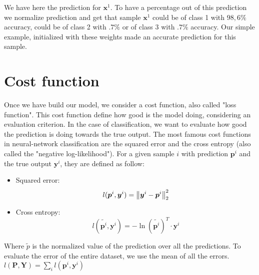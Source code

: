 		We have here the prediction for $\boldsymbol{x}^1$. To have a percentage out of this prediction we normalize prediction and get that sample $\boldsymbol{x}^1$ could be of class 1 with $98,6\%$ accuracy, could be of class 2 with $.7\%$ or of class 3 with $.7\%$ accuracy. Our simple example, initialized with these weights made an accurate prediction for this sample.
	

	\section{Cost function}
	\label{sec:cost_function}
		Once we have build our model, we consider a cost function, also called "loss function". This cost function define how good is the model doing, considering an evaluation criterion. In the case of classification, we want to evaluate how good the prediction is doing towards the true output.
		The most famous cost functions in neural-network classification are the squared error and the cross entropy (also called the "negative log-likelihood"). For a given sample $i$ with prediction $\boldsymbol{p}^i$ and the true output $\boldsymbol{y}^i$, they are defined as follow:
		\begin{itemize}
			\item Squared error: $$ l(\boldsymbol{p}^i,\boldsymbol{y}^i) = \left\lVert\boldsymbol{y}^i - \boldsymbol{p}^i\right\rVert_2^2 $$
			\item Cross entropy: $$ l(\widetilde{\boldsymbol{p}^i},\boldsymbol{y}^i) = -\ln(\widetilde{\boldsymbol{p}^i})^T\cdot{\boldsymbol{y}^i}  $$
		\end{itemize}
		Where $ \tilde{p} $ is the normalized value of the prediction over all the predictions. To evaluate the error of the entire dataset, we use the mean of all the errors. $l(\boldsymbol{P},\boldsymbol{Y}) = \sum_i l(\boldsymbol{p}^i,\boldsymbol{y}^i)$

